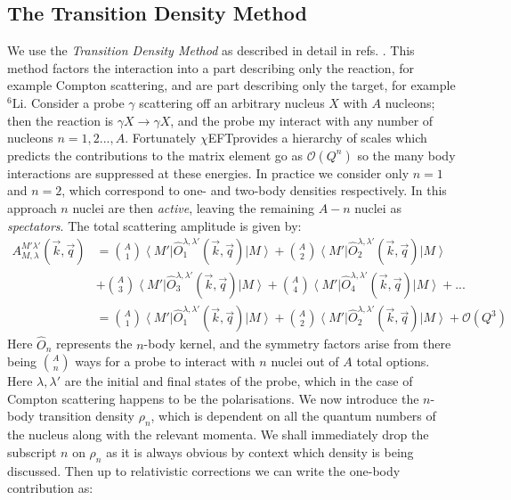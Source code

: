 \documentclass[12pt]{article}
\newcommand{\br}[1]{\left\langle #1 \right |}
\newcommand{\kt}[1]{\left| #1 \right \rangle}
\newcommand{\cEFT}{$\chi$EFT}
\newcommand{\sixLi}{{}^{6} \mathrm{Li} }
\newcommand{\3}{\ss}
\numberwithin{equation}{section}
\begin{document}
\subsection{The Transition Density Method}
We use the \textit{Transition Density Method} as described in detail
in refs. \cite{hgrie4He,hgrie3He, dm_density}.
This method factors the interaction into a part describing only the
reaction, for example Compton scattering, and are part describing
only the target, for example $\sixLi$.
Consider a probe $\gamma$ scattering off an arbitrary nucleus $X$
with $A$ nucleons; then the reaction is $\gamma X \to \gamma X$, and
the probe my interact with any number of nucleons $n =1,2..., A$.
Fortunately \cEFT\;provides a hierarchy of scales which predicts the
contributions to the matrix element go as $\mathcal{O}(Q^n)$ so the
many body interactions are suppressed at these energies.
In practice we consider only $n=1$ and $n=2$, which correspond to
one- and two-body densities respectively.
In this approach $n$ nuclei are then \textit{active}, leaving the
remaining $A-n$ nuclei as \textit{spectators}.
The total scattering amplitude is given by:
\begin{align}
  A_{M,\lambda}^{M'\lambda'}(\vec{k},\vec{q})&=
  \binom{A}{1} \br{M'}\hat{O}^{\lambda,\lambda'}_1(\vec{k},\vec{q})\kt{M}+
  \binom{A}{2}
  \br{M'}\hat{O}^{\lambda,\lambda'}_2(\vec{k},\vec{q})\kt{M}\nonumber\\
  &+\binom{A}{3} \br{M'}\hat{O}^{\lambda,\lambda'}_3(\vec{k},\vec{q})\kt{M}+
  \binom{A}{4} \br{M'}\hat{O}^{\lambda,\lambda'}_4(\vec{k},\vec{q})\kt{M}+...\\
  &= \binom{A}{1} \br{M'}\hat{O}^{\lambda,\lambda'}_1(\vec{k},\vec{q})\kt{M}+
  \binom{A}{2}
  \br{M'}\hat{O}^{\lambda,\lambda'}_2(\vec{k},\vec{q})\kt{M}+\mathcal{O}(Q^3)\label{Amp}
\end{align}
Here $\hat{O}_n$ represents the $n$-body kernel, and the symmetry
factors arise from there being $\binom{A}{n}$ ways for a probe to interact
with $n$ nuclei out of $A$ total options.
Here $\lambda, \lambda'$ are the initial and final states of the
probe, which in the case of Compton scattering happens
to be the polarisations.
We now introduce the $n$-body transition density $\rho_n$, which is
dependent on all the quantum numbers of the nucleus along with the
relevant momenta. We shall immediately drop the subscript $n$ on
$\rho_n$ as it is always obvious by context which density is being discussed.
Then up to relativistic corrections we can write the one-body contribution as:
\end{document}
